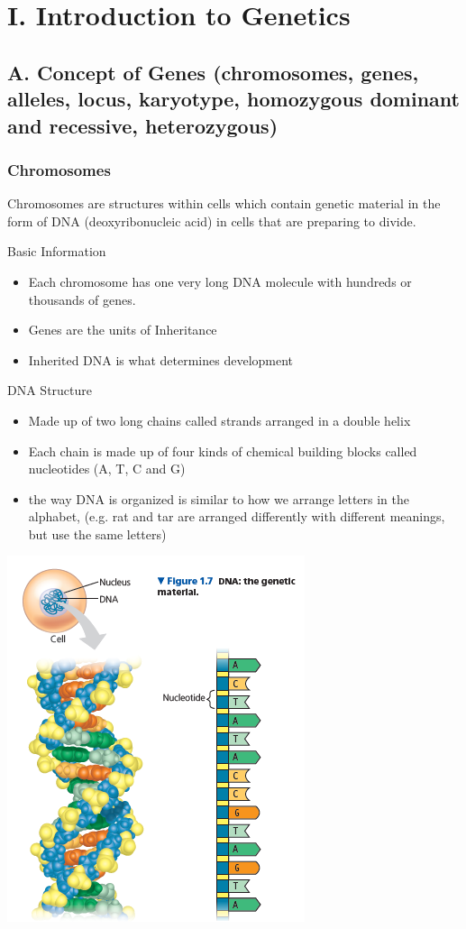 \documentclass{article}
\begin{document}
\section*{I. Introduction to Genetics}
\subsection*{A. Concept of Genes (chromosomes, genes, alleles, locus, karyotype, homozygous dominant and recessive, heterozygous)}
\subsubsection*{Chromosomes}
Chromosomes are structures within cells which contain genetic material in the form of DNA (deoxyribonucleic acid) in cells that are preparing to divide.


Basic Information
\begin{itemize}
    \item Each chromosome has one very long DNA molecule with hundreds or thousands of genes.
    \item Genes are the units of Inheritance
    \item Inherited DNA is what determines development
\end{itemize}


DNA Structure
\begin{itemize}
    \item Made up of two long chains called strands arranged in a double helix
    \item Each chain is made up of four kinds of chemical building blocks called nucleotides (A, T, C and G)
    \item the way DNA is organized is similar to how we arrange letters in the alphabet, (e.g. rat and tar are arranged differently with different meanings, but use the same letters)
\end{itemize}
\includegraphics[scale=1.5]{dnahelixstructure.png}
\end{document}

